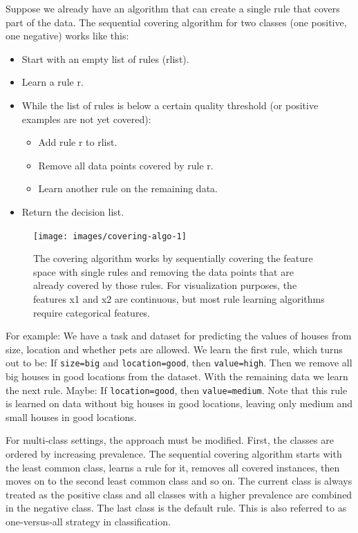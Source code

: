 \documentclass[
  12pt,
]{krantz}
\providecommand{\tightlist}{%
  \setlength{\itemsep}{0pt}\setlength{\parskip}{0pt}}
\begin{document}
Suppose we already have an algorithm that can create a single rule that covers part of the data.
The sequential covering algorithm for two classes (one positive, one negative) works like this:

\begin{itemize}
\tightlist
\item
  Start with an empty list of rules (rlist).
\item
  Learn a rule r.
\item
  While the list of rules is below a certain quality threshold (or positive examples are not yet covered):

  \begin{itemize}
  \tightlist
  \item
    Add rule r to rlist.
  \item
    Remove all data points covered by rule r.
  \item
    Learn another rule on the remaining data.
  \end{itemize}
\item
  Return the decision list.
\end{itemize}

\begin{figure}

{\centering \texttt{[image: images/covering-algo-1]} 

}

\caption{The covering algorithm works by sequentially covering the feature space with single rules and removing the data points that are already covered by those rules. For visualization purposes, the features x1 and x2 are continuous, but most rule learning algorithms require categorical features.}\label{fig:covering-algo}
\end{figure}

For example:
We have a task and dataset for predicting the values of houses from size, location and whether pets are allowed.
We learn the first rule, which turns out to be:
If \texttt{size=big} and \texttt{location=good}, then \texttt{value=high}.
Then we remove all big houses in good locations from the dataset.
With the remaining data we learn the next rule.
Maybe: If \texttt{location=good}, then \texttt{value=medium}.
Note that this rule is learned on data without big houses in good locations, leaving only medium and small houses in good locations.

For multi-class settings, the approach must be modified.
First, the classes are ordered by increasing prevalence.
The sequential covering algorithm starts with the least common class, learns a rule for it, removes all covered instances, then moves on to the second least common class and so on.
The current class is always treated as the positive class and all classes with a higher prevalence are combined in the negative class.
The last class is the default rule.
This is also referred to as one-versus-all strategy in classification.
\end{document}
